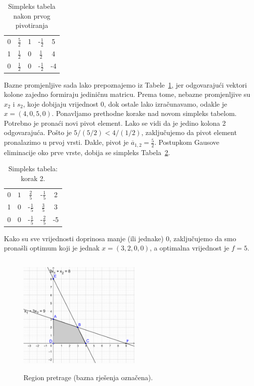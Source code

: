 \documentclass[b5paper, utf8, 11pt, colorlinks]{book}
\theoremstyle{definition}
\begin{document}
\begin{table}[H]
	\centering
	\begin{tabular}{c c c c | c}
		0 &  $\frac{5}{2}$  & 1 & -$\frac{1}{2} $& 5 \\
		1 &  $\frac{1}{2}$ & 0 & $\frac{1}{2}$ & 4 \\ \hline
		0 &  $\frac{1}{2}$ & 0 & -$\frac{1}{2}$ & -4 \\ \hline
	\end{tabular}
	\caption{Simpleks tabela nakon prvog pivotiranja}
	\label{tab:simpleks_tabela2}
\end{table}
Bazne promjenljive sada lako prepoznajemo iz Tabele~\ref{tab:simpleks_tabela2}, jer odgovarajući vektori kolone zajedno formiraju jediničnu matricu. Prema tome, 
nebazne promjenljive su $x_2$ i $s_2$, koje dobijaju vrijednost 0, dok ostale lako izračunavamo, odakle je $ x = (4, 0, 5, 0)$. Ponavljamo prethodne korake nad novom simpleks tabelom. Potrebno je pronaći novi pivot element. Lako se vidi da je jedino kolona 2 odgovarajuća. Pošto je $5 / (5/2) < 4 / (1/2)$, zaključujemo da  pivot element pronalazimo u prvoj vrsti. Dakle, pivot je 
$\overline{a}_{1,2} = \frac{5}{2}$. Postupkom Gausove eliminacije oko prve vrste, dobija se simpleks Tabela~\ref{tab:simpleks_tabela3}.

\begin{table}[!ht]
	\centering
	\begin{tabular}{c c c c | c}
		0 &  $1$  & $\frac{2}{5}$             &  -$\frac{1}{5} $ & 2 \\
		1 &  0    &      -$\frac{1}{5}$    & $\frac{3}{5}$    & 3 \\ \hline
		0 &  0    &   -$\frac{1}{5}$       &   -$\frac{2}{5}$   & -5 \\ \hline
	\end{tabular}
	\caption{Simpleks tabela: korak 2.}
	\label{tab:simpleks_tabela3}
\end{table}
Kako su sve vrijednosti doprinosa manje (ili jednake) 0, zaključujemo da smo pronašli optimum koji je jednak $x = (3, 2, 0, 0)$, a optimalna vrijednost je $f = 5$.

\begin{figure}[!ht]
	\centering
	\includegraphics[width=170pt, height=170pt]{simpleks-region-2.eps}
	\caption{Region pretrage (bazna rješenja označena).}
	\label{fig:simplex_region} 
\end{figure}
\end{document}

